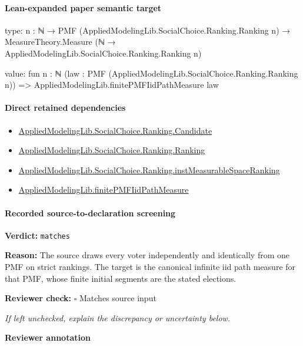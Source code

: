 \documentclass[10pt]{article}
\newcommand{\reviewerbox}{%
  \par\noindent\fbox{\parbox{0.96\linewidth}{\rule{0pt}{0.38in}}}\par
}
\newcommand{\reviewmatch}[1]{%
  \par\noindent\textbf{Reviewer check:} $\square$\; #1\par
  \noindent\emph{If left unchecked, explain the discrepancy or uncertainty below.}\par
}
\begin{document}
\paragraph{Lean-expanded paper semantic target}
\begin{ReviewVerbatim}
type:
{n : ℕ} →
  PMF (AppliedModelingLib.SocialChoice.Ranking.Ranking n) →
    MeasureTheory.Measure (ℕ → AppliedModelingLib.SocialChoice.Ranking.Ranking n)

value:
fun {n : ℕ} (law : PMF (AppliedModelingLib.SocialChoice.Ranking.Ranking n)) =>
  AppliedModelingLib.finitePMFIidPathMeasure law
\end{ReviewVerbatim}

\paragraph{Direct retained dependencies}
\begin{itemize}\raggedright
\item \hyperlink{governing-declaration-8c0e6c25845ae78a}{Applied\allowbreak{}Modeling\allowbreak{}Lib.\allowbreak{}Social\allowbreak{}Choice.\allowbreak{}Ranking.\allowbreak{}Candidate}
\item \hyperlink{governing-declaration-5cde54446d1ae021}{Applied\allowbreak{}Modeling\allowbreak{}Lib.\allowbreak{}Social\allowbreak{}Choice.\allowbreak{}Ranking.\allowbreak{}Ranking}
\item \hyperlink{governing-declaration-30ca9c740ef703ec}{Applied\allowbreak{}Modeling\allowbreak{}Lib.\allowbreak{}Social\allowbreak{}Choice.\allowbreak{}Ranking.\allowbreak{}inst\allowbreak{}Measurable\allowbreak{}Space\allowbreak{}Ranking}
\item \hyperlink{governing-declaration-779fe1555fbbcea5}{Applied\allowbreak{}Modeling\allowbreak{}Lib.\allowbreak{}finite\allowbreak{}PMF\allowbreak{}Iid\allowbreak{}Path\allowbreak{}Measure}
\end{itemize}
\paragraph{Recorded source-to-declaration screening}
\textbf{Verdict:} \texttt{matches}
\\
{\raggedright
\textbf{Reason:} The source draws every voter independently and identically from one PMF on strict rankings.\allowbreak{} The target is the canonical infinite iid path measure for that PMF, whose finite initial segments are the stated elections.\allowbreak{}
\par}
\reviewmatch{Matches source input}
\noindent\textbf{Reviewer annotation}\par
\reviewerbox
\clearpage
\hypertarget{paper-prerequisite-fccf8d59da117c80}{}
\end{document}

